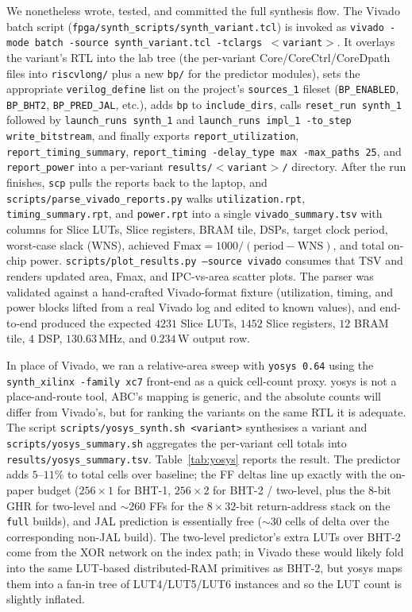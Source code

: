 \documentclass[10pt]{article}
\begin{document}
We nonetheless wrote, tested, and committed the full synthesis flow.
The Vivado batch script
(\texttt{fpga/synth\_scripts/synth\_variant.tcl}) is invoked as
\texttt{vivado -mode batch -source synth\_variant.tcl -tclargs $<$variant$>$}.
It overlays the variant's RTL into the lab tree (the per-variant
Core/CoreCtrl/CoreDpath files into \texttt{riscvlong/} plus a new
\texttt{bp/} for the predictor modules), sets the appropriate
\texttt{verilog\_define} list on the project's \texttt{sources\_1}
fileset (\texttt{BP\_ENABLED}, \texttt{BP\_BHT2},
\texttt{BP\_PRED\_JAL}, etc.), adds \texttt{bp} to
\texttt{include\_dirs}, calls \texttt{reset\_run synth\_1} followed by
\texttt{launch\_runs synth\_1} and \texttt{launch\_runs impl\_1
-to\_step write\_bitstream}, and finally exports
\texttt{report\_utilization}, \texttt{report\_timing\_summary},
\texttt{report\_timing -delay\_type max -max\_paths 25}, and
\texttt{report\_power} into a per-variant
\texttt{results/$<$variant$>$/} directory.
After the run finishes,
\texttt{scp} pulls the reports back to the laptop, and
\texttt{scripts/parse\_vivado\_reports.py} walks
\texttt{utilization.rpt}, \texttt{timing\_summary.rpt}, and
\texttt{power.rpt} into a single \texttt{vivado\_summary.tsv} with
columns for Slice LUTs, Slice registers, BRAM tile, DSPs, target
clock period, worst-case slack (WNS), achieved
$\text{Fmax} = 1000 / (\text{period} - \text{WNS})$, and total
on-chip power. \texttt{scripts/plot\_results.py --source vivado}
consumes that TSV and renders updated area, Fmax, and IPC-vs-area
scatter plots. The parser was validated against a hand-crafted
Vivado-format fixture (utilization, timing, and power blocks lifted
from a real Vivado log and edited to known values), and end-to-end
produced the expected $4231$ Slice LUTs, $1452$ Slice registers,
$12$ BRAM tile, $4$ DSP, $130.63$\,MHz, and $0.234$\,W output row.

In place of Vivado, we ran a relative-area sweep with
\texttt{yosys 0.64} using the \texttt{synth\_xilinx -family xc7}
front-end as a quick cell-count proxy. yosys is not a place-and-route
tool, ABC's mapping is generic, and the absolute counts will differ
from Vivado's, but for ranking the variants on the same RTL it is
adequate. The script
\texttt{scripts/yosys\_synth.sh <variant>} synthesises a variant and
\texttt{scripts/yosys\_summary.sh} aggregates the per-variant cell
totals into \texttt{results/yosys\_summary.tsv}.
Table~\ref{tab:yosys} reports the result. The predictor adds
$5\text{--}11\%$ to total cells over baseline; the FF deltas line up
exactly with the on-paper budget ($256 \times 1$ for BHT-1, $256 \times 2$
for BHT-2 / two-level, plus the 8-bit GHR for two-level and
$\sim$260 FFs for the $8 \times 32$-bit return-address stack on the
\texttt{full} builds), and JAL prediction is essentially free
($\sim$30 cells of delta over the corresponding non-JAL build). The
two-level predictor's extra LUTs over BHT-2 come from the XOR
network on the index path; in Vivado these would likely fold into
the same LUT-based distributed-RAM primitives as BHT-2, but yosys
maps them into a fan-in tree of LUT4/LUT5/LUT6 instances and so the
LUT count is slightly inflated.
\end{document}

